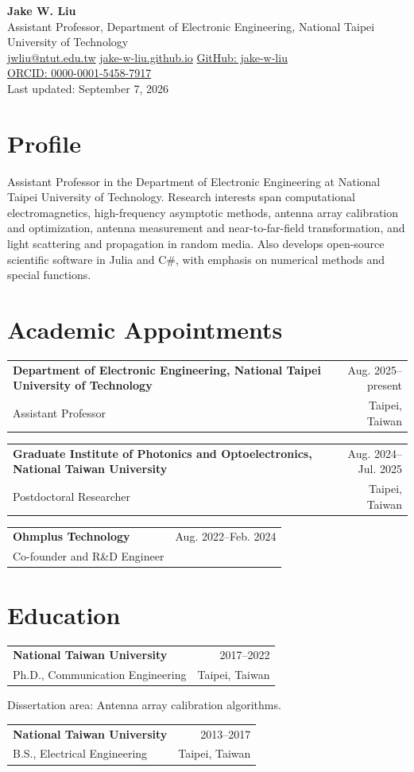 \documentclass[11pt,a4paper]{article}
\makeatletter
\newcommand{\daterange}[1]{\textcolor{accent}{#1}}
\newcommand{\entry}[4]{%
  \begin{tabularx}{\textwidth}{@{}X r@{}}
    \textbf{#1} & \daterange{#2} \\
    #3 & #4 \\
  \end{tabularx}
}
\makeatother
\begin{document}
\begin{center}
{\LARGE \textbf{Jake W. Liu}}\\[0.25em]
Assistant Professor, Department of Electronic Engineering, National Taipei University of Technology\\[0.25em]
{\small
\href{mailto:jwliu@ntut.edu.tw}{jwliu@ntut.edu.tw} \quad
\href{https://jake-w-liu.github.io}{jake-w-liu.github.io} \quad
\href{https://github.com/jake-w-liu}{GitHub: jake-w-liu}\\
\href{https://orcid.org/0000-0001-5458-7917}{ORCID: 0000-0001-5458-7917}}\\
Last updated: September 7, 2026
\end{center}

\section*{Profile}
Assistant Professor in the Department of Electronic Engineering at National Taipei University of Technology. Research interests span computational electromagnetics, high-frequency asymptotic methods, antenna array calibration and optimization, antenna measurement and near-to-far-field transformation, and light scattering and propagation in random media. Also develops open-source scientific software in Julia and C\#, with emphasis on numerical methods and special functions.

\section*{Academic Appointments}
\entry{Department of Electronic Engineering, National Taipei University of Technology}{Aug. 2025--present}{Assistant Professor}{Taipei, Taiwan}

\entry{Graduate Institute of Photonics and Optoelectronics, National Taiwan University}{Aug. 2024--Jul. 2025}{Postdoctoral Researcher}{Taipei, Taiwan}

\entry{Ohmplus Technology}{Aug. 2022--Feb. 2024}{Co-founder and R\&D Engineer}{}

\section*{Education}
\entry{National Taiwan University}{2017--2022}{Ph.D., Communication Engineering}{Taipei, Taiwan}
Dissertation area: Antenna array calibration algorithms.

\entry{National Taiwan University}{2013--2017}{B.S., Electrical Engineering}{Taipei, Taiwan}
\end{document}
